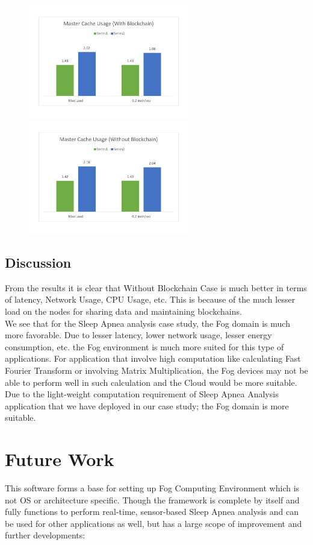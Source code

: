 \documentclass[AMA,STIX1COL]{WileyNJD-v2}
\begin{document}
\begin{figure}[h]
\centering
\includegraphics[width=7cm]{g101} \ \ \ \ \ \ \ \ \ \ \       
\includegraphics[width=7cm]{g102}
\end{figure}

\subsection{Discussion}

From the results it is clear that Without Blockchain Case is much better in terms of latency, Network Usage, CPU Usage, etc. This is because of the much lesser load on the nodes for sharing data and maintaining blockchains.\\ 
We see that for the Sleep Apnea analysis case study, the Fog domain is much more favorable. Due to lesser latency, lower network usage, lesser energy consumption, etc. the Fog environment is much more suited for this type of applications. For application that involve high computation like calculating Fast Fourier Transform or involving Matrix Multiplication, the Fog devices may not be able to perform well in such calculation and the Cloud would be more suitable. Due to the light-weight computation requirement of Sleep Apnea Analysis application that we have deployed in our case study; the Fog domain is more suitable.

\section{Future Work}
This software forms a base for setting up Fog Computing Environment which is not OS or architecture specific. Though the framework is complete by itself and fully functions to perform real-time, sensor-based Sleep Apnea analysis and can be used for other applications as well, but has a large scope of improvement and further developments:
\end{document}
